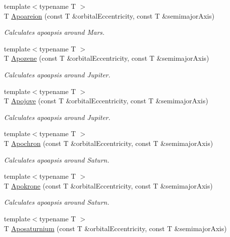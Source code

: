 \begin{DoxyCompactItemize}
{\footnotesize template$<$typename T $>$ }\\T \mbox{\hyperlink{group___e_g_x_phys-_apoapsis_ga8d8ac5814f653e229e1d463b432ffca5}{Apoareion}} (const T \&orbital\+Eccentricity, const T \&semimajor\+Axis)
\begin{DoxyCompactList}\small\item\em Calculates apoapsis around Mars. \end{DoxyCompactList}\item 
{\footnotesize template$<$typename T $>$ }\\T \mbox{\hyperlink{group___e_g_x_phys-_apoapsis_ga44d3dd8d8b350d053b25b7b1f1e15534}{Apozene}} (const T \&orbital\+Eccentricity, const T \&semimajor\+Axis)
\begin{DoxyCompactList}\small\item\em Calculates apoapsis around Jupiter. \end{DoxyCompactList}\item 
{\footnotesize template$<$typename T $>$ }\\T \mbox{\hyperlink{group___e_g_x_phys-_apoapsis_ga5a45d0a873514113aaa0adc95aefbbde}{Apojove}} (const T \&orbital\+Eccentricity, const T \&semimajor\+Axis)
\begin{DoxyCompactList}\small\item\em Calculates apoapsis around Jupiter. \end{DoxyCompactList}\item 
{\footnotesize template$<$typename T $>$ }\\T \mbox{\hyperlink{group___e_g_x_phys-_apoapsis_gae4ea146039e6f32022321f0998e715e8}{Apochron}} (const T \&orbital\+Eccentricity, const T \&semimajor\+Axis)
\begin{DoxyCompactList}\small\item\em Calculates apoapsis around Saturn. \end{DoxyCompactList}\item 
{\footnotesize template$<$typename T $>$ }\\T \mbox{\hyperlink{group___e_g_x_phys-_apoapsis_ga98557a8d49aa129c29e652c4758334d1}{Apokrone}} (const T \&orbital\+Eccentricity, const T \&semimajor\+Axis)
\begin{DoxyCompactList}\small\item\em Calculates apoapsis around Saturn. \end{DoxyCompactList}\item 
{\footnotesize template$<$typename T $>$ }\\T \mbox{\hyperlink{group___e_g_x_phys-_apoapsis_gac157adc20a88c8616e4822eb819f9016}{Aposaturnium}} (const T \&orbital\+Eccentricity, const T \&semimajor\+Axis)

\end{DoxyCompactItemize}

